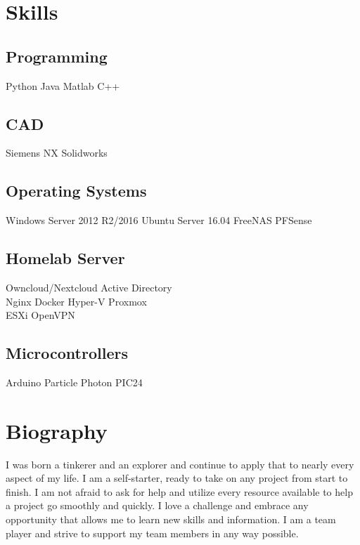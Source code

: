 \documentclass[]{deedy-resume-openfont}
\begin{document}
\begin{minipage}[t]{0.33\textwidth}

\section{Skills}
\subsection{Programming}
Python \textbullet{} Java \textbullet{} Matlab \textbullet{} C++ \\
\subsection{CAD}
Siemens NX \textbullet{} Solidworks \\
\subsection{Operating Systems}
Windows Server 2012 R2/2016 \textbullet{} Ubuntu Server 16.04 \textbullet{} FreeNAS \textbullet{} PFSense \\
\subsection{Homelab Server}
Owncloud/Nextcloud \textbullet{} Active Directory \\
Nginx \textbullet{} Docker \textbullet{}  Hyper-V \textbullet{} Proxmox \\
ESXi \textbullet{} OpenVPN
\subsection{Microcontrollers}
Arduino \textbullet{} Particle Photon \textbullet{} PIC24
\sectionsep

\section{Biography}
I was born a tinkerer and an explorer and continue to apply that to nearly every aspect of my life. I am a self-starter, ready to take on any project from start to finish. I am not afraid to ask for help and utilize every resource available to help a project go smoothly and quickly. I love a challenge and embrace any opportunity that allows me to learn new skills and information. I am a team player and strive to support my team members in any way possible.

%
%

\end{minipage} 
\end{document}
